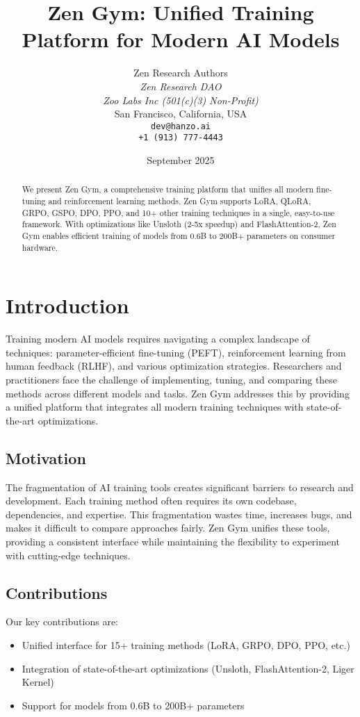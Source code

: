 \documentclass[11pt,a4paper]{article}
\title{Zen Gym: Unified Training Platform for Modern AI Models}
\author{
    Zen Research Authors \\
    \textit{Zen Research DAO} \\
    \textit{Zoo Labs Inc (501(c)(3) Non-Profit)} \\
    San Francisco, California, USA \\
    \texttt{dev@hanzo.ai} \\
    \texttt{+1 (913) 777-4443}
}
\date{September 2025}
\begin{document}
\maketitle

\begin{abstract}
We present Zen Gym, a comprehensive training platform that unifies all modern fine-tuning and reinforcement learning methods. Zen Gym supports LoRA, QLoRA, GRPO, GSPO, DPO, PPO, and 10+ other training techniques in a single, easy-to-use framework. With optimizations like Unsloth (2-5x speedup) and FlashAttention-2, Zen Gym enables efficient training of models from 0.6B to 200B+ parameters on consumer hardware.
\end{abstract}

\section{Introduction}

Training modern AI models requires navigating a complex landscape of techniques: parameter-efficient fine-tuning (PEFT), reinforcement learning from human feedback (RLHF), and various optimization strategies. Researchers and practitioners face the challenge of implementing, tuning, and comparing these methods across different models and tasks. Zen Gym addresses this by providing a unified platform that integrates all modern training techniques with state-of-the-art optimizations.

\subsection{Motivation}
The fragmentation of AI training tools creates significant barriers to research and development. Each training method often requires its own codebase, dependencies, and expertise. This fragmentation wastes time, increases bugs, and makes it difficult to compare approaches fairly. Zen Gym unifies these tools, providing a consistent interface while maintaining the flexibility to experiment with cutting-edge techniques.

\subsection{Contributions}
Our key contributions are:
\begin{itemize}
    \item Unified interface for 15+ training methods (LoRA, GRPO, DPO, PPO, etc.)
    \item Integration of state-of-the-art optimizations (Unsloth, FlashAttention-2, Liger Kernel)
    \item Support for models from 0.6B to 200B+ parameters
\end{itemize}
\end{document}
